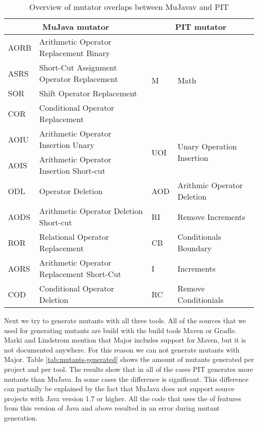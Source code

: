 \documentclass[../main]{subfiles}
\begin{document}
\begin{table}[htb]
\centering
\begin{tabular}{|l|l|l|l|}
\hline
\multicolumn{2}{|c|}{\textbf{ MuJava mutator}}      & \multicolumn{2}{c|}{\textbf{PIT mutator}}                         \\ \hline
AORB & Arithmetic Operator Replacement Binary      & \multirow{4}{*}{M}   & \multirow{4}{*}{Math}                      \\ \cline{1-2}
ASRS & Short-Cut Assignment   Operator Replacement &                      &                                            \\ \cline{1-2}
SOR  & Shift Operator   Replacement                &                      &                                            \\ \cline{1-2}
COR  & Conditional Operator   Replacement          &                      &                                            \\ \hline
AOIU & Arithmetic Operator   Insertion Unary       & \multirow{2}{*}{UOI} & \multirow{2}{*}{Unary Operation Insertion} \\ \cline{1-2}
AOIS & Arithmetic Operator   Insertion Short-cut   &                      &                                            \\ \hline
ODL  & Operator Deletion                           & AOD                  & Arithmic Operator   Deletion               \\ \hline
AODS & Arithmetic Operator   Deletion Short-cut    & RI                   & Remove Increments                          \\ \hline
ROR  & Relational Operator   Replacement           & CB                   & Conditionals Boundary                      \\ \hline
AORS & Arithmetic Operator   Replacement Short-Cut & I                    & Increments                                 \\ \hline
COD  & Conditional Operator   Deletion             & RC                   & Remove Conditionials                       \\ \hline

\end{tabular}
\caption{\label{tab:mutators-overlap}Overview of mutator overlaps between  MuJavav and PIT}
\end{table}
Next we try to generate mutants with all three tools. 
All of the sources that we used for generating mutants are build with the build tools Maven or Gradle. 
Marki and Lindstrom\cite{Marki2017MutationJava} mention that Major includes support for Maven, but it is not documented anywhere.
For this reason we can not generate mutants with Major.
Table \ref{tab:mutants-generated} shows the amount of mutants generated per project and per tool. The results show that in all of the cases PIT generates more mutants than MuJava. In some cases the difference is significant. This difference can partially be explained by the fact that MuJava does not support source projects with Java version 1.7 or higher\cite{mujava}. All the code that uses the of features from this version of Java and above resulted in an error during mutant generation.
\end{document}
